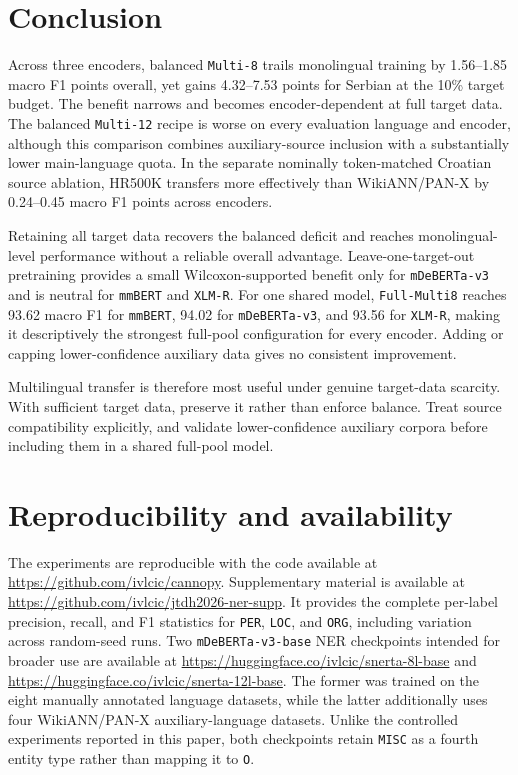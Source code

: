 \documentclass{article}
\begin{document}
\section{Conclusion}
\label{sec:conclusion}

Across three encoders, balanced \texttt{Multi-8} trails monolingual training by 1.56--1.85 macro F1 points overall, yet gains 4.32--7.53 points for Serbian at the 10\% target budget.
The benefit narrows and becomes encoder-dependent at full target data.
The balanced \texttt{Multi-12} recipe is worse on every evaluation language and encoder, although this comparison combines auxiliary-source inclusion with a substantially lower main-language quota.
In the separate nominally token-matched Croatian source ablation, HR500K transfers more effectively than WikiANN/PAN-X by 0.24--0.45 macro F1 points across encoders.

Retaining all target data recovers the balanced deficit and reaches monolingual-level performance without a reliable overall advantage.
Leave-one-target-out pretraining provides a small Wilcoxon-supported benefit only for \texttt{mDeBERTa-v3} and is neutral for \texttt{mmBERT} and \texttt{XLM-R}.
For one shared model, \texttt{Full-Multi8} reaches 93.62 macro F1 for \texttt{mmBERT}, 94.02 for \texttt{mDeBERTa-v3}, and 93.56 for \texttt{XLM-R}, making it descriptively the strongest full-pool configuration for every encoder.
Adding or capping lower-confidence auxiliary data gives no consistent improvement.

Multilingual transfer is therefore most useful under genuine target-data scarcity.
With sufficient target data, preserve it rather than enforce balance.
Treat source compatibility explicitly, and validate lower-confidence auxiliary corpora before including them in a shared full-pool model.

\section{Reproducibility and availability}

The experiments are reproducible with the code available at \url{https://github.com/ivlcic/cannopy}.
Supplementary material is available at \url{https://github.com/ivlcic/jtdh2026-ner-supp}.
It provides the complete per-label precision, recall, and F1 statistics for \texttt{PER}, \texttt{LOC}, and \texttt{ORG}, including variation across random-seed runs.
Two \texttt{mDeBERTa-v3-base} NER checkpoints intended for broader use are available at \url{https://huggingface.co/ivlcic/snerta-8l-base} and \url{https://huggingface.co/ivlcic/snerta-12l-base}.
The former was trained on the eight manually annotated language datasets, while the latter additionally uses four WikiANN/PAN-X auxiliary-language datasets.
Unlike the controlled experiments reported in this paper, both checkpoints retain \texttt{MISC} as a fourth entity type rather than mapping it to \texttt{O}.
\end{document}
